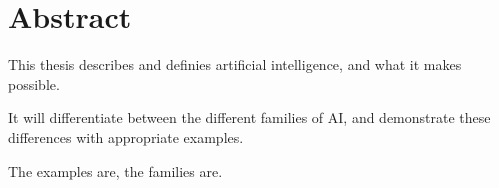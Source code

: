 \chapter*{Abstract}
This thesis describes and definies artificial intelligence, and what it makes possible. 

It will differentiate between the different families of AI, and demonstrate these differences with appropriate examples.

The examples are, the families are.

